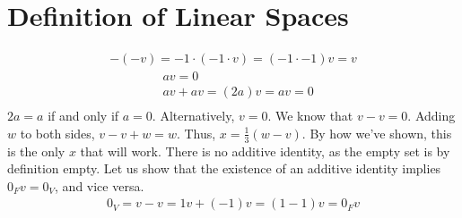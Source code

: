 \documentclass{book}
\begin{document}
\section{Definition of Linear Spaces}
  \begin{enumerate}[label=\arabic*)]
    \ii 
      \begin{align*}
        -(-v) = -1\cdot(-1\cdot v) = (-1\cdot -1)v = v
      \end{align*}
    \ii
      \begin{align*}
        &av = 0 \\
        &av + av = (2a)v = av = 0 \\
      \end{align*}
      $2a = a$ if and only if $a = 0$. Alternatively, $v = 0$.
    \ii
      We know that $v - v = 0$. Adding $w$ to both sides, $v - v + w = w$. Thus, $x = \frac{1}{3}(w - v)$. By how we've shown, this is the only $x$ that will work.
    \ii
      There is no additive identity, as the empty set is by definition empty.
    \ii
      Let us show that the existence of an additive identity implies $0_Fv = 0_V$, and vice versa. 
      \begin{align*}
        0_V = v - v = 1v + (-1)v = (1 - 1)v = 0_Fv
      \end{align*}
  \end{enumerate}
\end{document}
